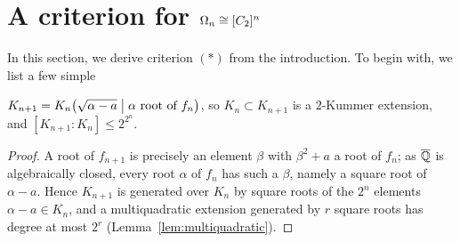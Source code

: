 \chapter{\texorpdfstring{A criterion for $\Omega_n \cong [C_2]^{n}$}{A criterion for the full wreath
  power}}
\label{chap:paper-criterion}

\setcounter{theorem}{-1}

In this section, we derive criterion $(*)$ from the introduction. To begin with, we list a few
simple

\begin{sharedfacts}
  \label{facts:1.0}
  $K_{n+1} = K_n\bigl(\sqrt{\alpha - a} \bigm| \alpha \text{ root of }
  f_n\bigr)$, so $K_n \subset K_{n+1}$ is a $2$-Kummer extension, and
  $[K_{n+1} : K_n] \le 2^{2^n}$.
\end{sharedfacts}
\begin{proof}
  A root of $f_{n+1}$ is precisely
  an element $\beta$ with $\beta^2 + a$ a root of $f_n$; as $\overline{\mathbb{Q}}$ is algebraically closed,
  every root $\alpha$ of $f_n$ has such a $\beta$, namely a square root of $\alpha - a$. Hence
  $K_{n+1}$ is generated over $K_n$ by square roots of the $2^n$ elements $\alpha - a \in K_n$,
  and a multiquadratic extension generated by $r$ square roots has degree at most $2^r$
  (Lemma~\ref{lem:multiquadratic}).
\end{proof}

